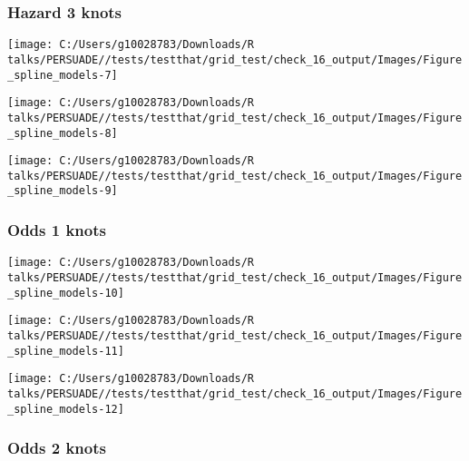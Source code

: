 \documentclass[
]{article}
\begin{document}
\subsubsection{Hazard 3 knots}\label{hazard-3-knots}

\begin{flushleft}\texttt{[image: C:/Users/g10028783/Downloads/R talks/PERSUADE//tests/testthat/grid\_test/check\_16\_output/Images/Figure\_spline\_models-7]} \end{flushleft}

\begin{flushleft}\texttt{[image: C:/Users/g10028783/Downloads/R talks/PERSUADE//tests/testthat/grid\_test/check\_16\_output/Images/Figure\_spline\_models-8]} \end{flushleft}

\begin{flushleft}\texttt{[image: C:/Users/g10028783/Downloads/R talks/PERSUADE//tests/testthat/grid\_test/check\_16\_output/Images/Figure\_spline\_models-9]} \end{flushleft}

\clearpage

\subsubsection{Odds 1 knots}\label{odds-1-knots}

\begin{flushleft}\texttt{[image: C:/Users/g10028783/Downloads/R talks/PERSUADE//tests/testthat/grid\_test/check\_16\_output/Images/Figure\_spline\_models-10]} \end{flushleft}

\begin{flushleft}\texttt{[image: C:/Users/g10028783/Downloads/R talks/PERSUADE//tests/testthat/grid\_test/check\_16\_output/Images/Figure\_spline\_models-11]} \end{flushleft}

\begin{flushleft}\texttt{[image: C:/Users/g10028783/Downloads/R talks/PERSUADE//tests/testthat/grid\_test/check\_16\_output/Images/Figure\_spline\_models-12]} \end{flushleft}

\clearpage

\subsubsection{Odds 2 knots}\label{odds-2-knots}
\end{document}
